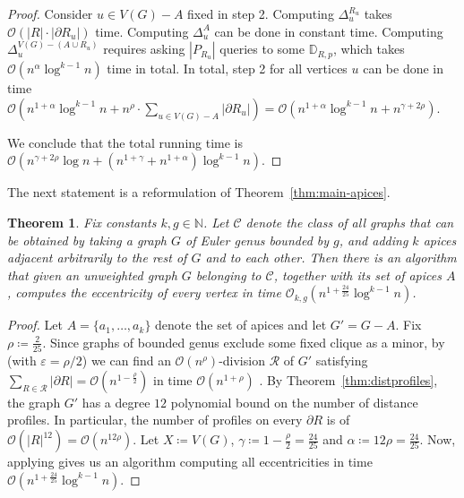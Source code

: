 \documentclass[11pt,a4paper]{article}
\newtheorem{theorem}[lemma]{Theorem}
\newcommand{\Oh}{\mathcal{O}}
\renewcommand{\setminus}{-}
\begin{document}
\begin{proof}
    Consider $u \in V(G) \setminus A$ fixed in step 2. Computing $\Delta^{R_u}_u$ takes $\Oh (|R| \cdot |\partial R_u|)$ time. Computing $\Delta^{A}_u$ can be done in constant time. Computing $\Delta^{V(G) \setminus (A \cup R_u)}_u$ requires asking $|P_{R_u}|$ queries to some $\mathbb{D}_{R, p}$, which takes $\Oh (n^{\alpha} \log^{k - 1} n)$ time in total.
    In total, step 2 for all vertices $u$ can be done in time $\Oh (n^{1 + \alpha} \log^{k - 1} n + n^\rho \cdot \sum_{u \in V(G) \setminus A} |\partial R_u|) = \Oh (n^{1 + \alpha} \log^{k - 1} n + n^{\gamma + 2\rho})$.
    
    We conclude that the total running time is $\Oh(n^{\gamma + 2\rho} \log n + (n^{1 + \gamma} + n^{1 + \alpha}) \log^{k - 1} n)$.
\end{proof}

The next statement is a reformulation of Theorem~\ref{thm:main-apices}. 

\begin{theorem}\label{t:main_bdgenus_apices}
Fix constants $k, g \in \mathbb{N}$. Let $\mathcal{C}$ denote the class of all graphs that can be obtained by taking a graph $G$ of Euler genus bounded by $g$, and adding $k$ apices adjacent arbitrarily to the rest of $G$ and to each other. Then there is an algorithm that given an unweighted graph $G$ belonging to $\mathcal{C}$, together with its set of apices $A$, computes the eccentricity of every vertex in time $\Oh_{k,g} \left( n^{1 + \frac{24}{25}} \log^{k - 1} n \right)$.
\end{theorem}

\begin{proof}
Let $A = \{a_1, \dots, a_k\}$ denote the set of apices and let $G' = G - A$. Fix $\rho\coloneqq \frac{2}{25}$.
Since graphs of bounded genus exclude some fixed clique as a minor,
by  (with $\varepsilon = \rho/2$)
we can find an $\Oh(n^\rho)$-division $\mathcal{R}$ of $G'$
satisfying $\sum_{R \in \mathcal{R}} |\partial R| = \Oh (n^{1 - \frac{\rho}{2}})$
in time $\Oh(n^{1 + \rho})$ .
By Theorem~\ref{thm:distprofiles}, the graph $G'$ has a degree $12$ polynomial bound on the number of distance profiles. In particular, the number of profiles on every $\partial R$ is of $\Oh(|R|^{12}) = \Oh(n^{12\rho})$. Let $X \coloneqq V(G)$, $\gamma \coloneqq 1 - \frac{\rho}{2} = \frac{24}{25}$ and $\alpha \coloneqq 12\rho = \frac{24}{25}$. Now,  applying  gives us an algorithm computing all eccentricities in time $\Oh(n^{1 + \frac{24}{25}} \log^{k - 1} n)$.
\end{proof}
 
\end{document}
